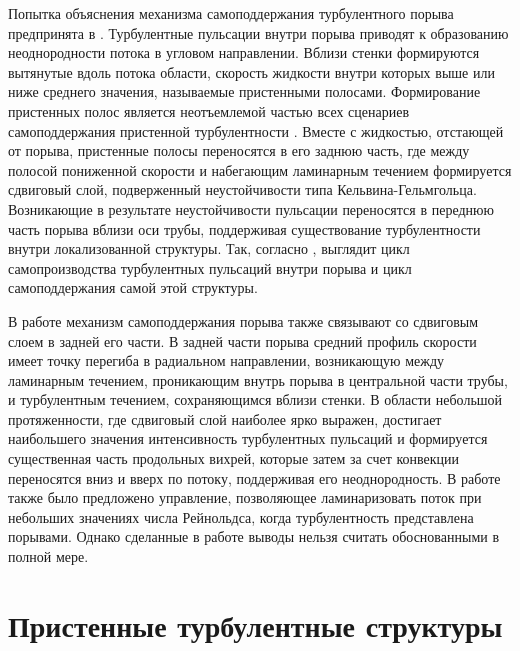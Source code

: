 Попытка объяснения механизма самоподдержания турбулентного порыва предпринята в \cite{Shimizu2009}. Турбулентные пульсации внутри порыва приводят к образованию неоднородности потока в угловом направлении. Вблизи стенки формируются вытянутые вдоль потока области, скорость жидкости внутри которых выше или ниже среднего значения, называемые пристенными полосами. Формирование пристенных полос является неотъемлемой частью всех сценариев самоподдержания пристенной турбулентности \cite{Hamilton1995, Waleffe1997, Schoppa2002}. Вместе с жидкостью, отстающей от порыва, пристенные полосы переносятся в его заднюю часть, где между полосой пониженной скорости и набегающим ламинарным течением формируется сдвиговый слой, подверженный неустойчивости типа Кельвина-Гельмгольца. Возникающие в результате неустойчивости пульсации переносятся в переднюю часть порыва вблизи оси трубы, поддерживая существование турбулентности внутри локализованной структуры. Так, согласно \cite{Shimizu2009}, выглядит цикл самопроизводства турбулентных пульсаций внутри порыва и цикл самоподдержания самой этой структуры. 

В работе \cite{Hof2010} механизм самоподдержания порыва также связывают со сдвиговым слоем в задней его части. В задней части порыва средний профиль скорости имеет точку перегиба в радиальном направлении, возникающую между ламинарным течением, проникающим внутрь порыва в центральной части трубы, и турбулентным течением, сохраняющимся вблизи стенки. В области небольшой протяженности, где сдвиговый слой наиболее ярко выражен, достигает наибольшего значения интенсивность турбулентных пульсаций и формируется существенная часть продольных вихрей, которые затем за счет конвекции переносятся вниз и вверх по потоку, поддерживая его неоднородность. В работе \cite{Hof2010} также было предложено управление, позволяющее ламинаризовать поток при небольших значениях числа Рейнольдса, когда турбулентность представлена порывами. Однако сделанные в работе выводы нельзя считать обоснованными в полной мере. 


\section{Пристенные турбулентные структуры} \label{structure_subsection}

